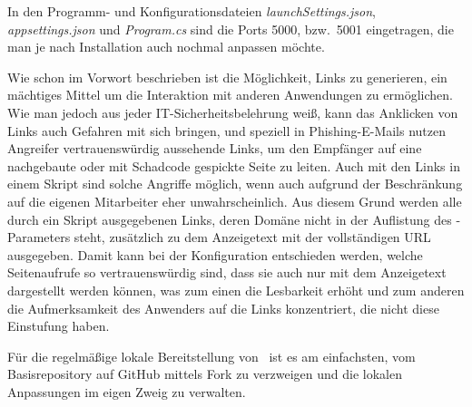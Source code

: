 In den Programm- und Konfigurationsdateien \emph{launchSettings.json}, \emph{appsettings.json} und \emph{Program.cs} sind die Ports 5000, bzw.\ 5001 eingetragen, die man je nach Installation auch nochmal anpassen möchte.

Wie schon im Vorwort beschrieben ist die Möglichkeit, Links zu generieren, ein mächtiges Mittel um die Interaktion mit anderen Anwendungen zu ermöglichen. Wie man jedoch aus jeder IT-Sicherheitsbelehrung weiß, kann das Anklicken von Links auch Gefahren mit sich bringen, und speziell in Phishing-E-Mails nutzen Angreifer vertrauenswürdig aussehende Links, um den Empfänger auf eine nachgebaute oder mit Schadcode gespickte Seite zu leiten. Auch mit den Links in einem Skript sind solche Angriffe möglich, wenn auch aufgrund der Beschränkung auf die eigenen Mitarbeiter eher unwahrscheinlich. Aus diesem Grund werden alle durch ein Skript ausgegebenen Links, deren Domäne nicht in der Auf\-lis\-tung des -Parameters steht, zusätzlich zu dem Anzeigetext mit der vollständigen URL ausgegeben. Damit kann bei der Konfiguration entschieden werden, welche Seitenaufrufe so vertrauenswürdig sind, dass sie auch nur mit dem Anzeigetext dargestellt werden können, was zum einen die Lesbarkeit erhöht und zum anderen die Aufmerksamkeit des Anwenders auf die Links konzentriert, die nicht diese Einstufung haben.

Für die regelmäßige lokale Bereitstellung von \FPZ\ ist es am einfachsten, vom Basisrepository auf GitHub mittels Fork zu verzweigen und die lokalen Anpassungen im eigen Zweig zu verwalten.

